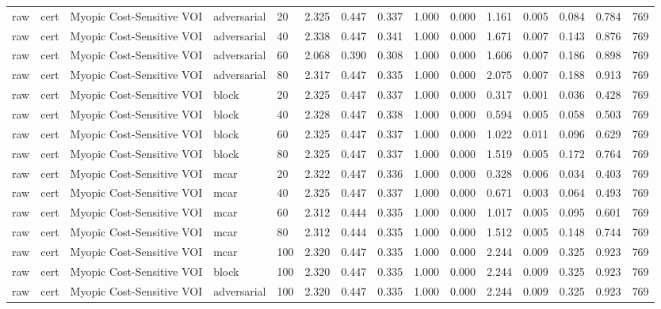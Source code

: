 \begin{table}[!ht]
{\begin{tabular}{lllllllllllllll}
raw & cert & Myopic Cost-Sensitive VOI & adversarial & 20 & 2.325 & 0.447 & 0.337 & 1.000 & 0.000 & 1.161 & 0.005 & 0.084 & 0.784 & 769 \\
raw & cert & Myopic Cost-Sensitive VOI & adversarial & 40 & 2.338 & 0.447 & 0.341 & 1.000 & 0.000 & 1.671 & 0.007 & 0.143 & 0.876 & 769 \\
raw & cert & Myopic Cost-Sensitive VOI & adversarial & 60 & 2.068 & 0.390 & 0.308 & 1.000 & 0.000 & 1.606 & 0.007 & 0.186 & 0.898 & 769 \\
raw & cert & Myopic Cost-Sensitive VOI & adversarial & 80 & 2.317 & 0.447 & 0.335 & 1.000 & 0.000 & 2.075 & 0.007 & 0.188 & 0.913 & 769 \\
raw & cert & Myopic Cost-Sensitive VOI & block & 20 & 2.325 & 0.447 & 0.337 & 1.000 & 0.000 & 0.317 & 0.001 & 0.036 & 0.428 & 769 \\
raw & cert & Myopic Cost-Sensitive VOI & block & 40 & 2.328 & 0.447 & 0.338 & 1.000 & 0.000 & 0.594 & 0.005 & 0.058 & 0.503 & 769 \\
raw & cert & Myopic Cost-Sensitive VOI & block & 60 & 2.325 & 0.447 & 0.337 & 1.000 & 0.000 & 1.022 & 0.011 & 0.096 & 0.629 & 769 \\
raw & cert & Myopic Cost-Sensitive VOI & block & 80 & 2.325 & 0.447 & 0.337 & 1.000 & 0.000 & 1.519 & 0.005 & 0.172 & 0.764 & 769 \\
raw & cert & Myopic Cost-Sensitive VOI & mcar & 20 & 2.322 & 0.447 & 0.336 & 1.000 & 0.000 & 0.328 & 0.006 & 0.034 & 0.403 & 769 \\
raw & cert & Myopic Cost-Sensitive VOI & mcar & 40 & 2.325 & 0.447 & 0.337 & 1.000 & 0.000 & 0.671 & 0.003 & 0.064 & 0.493 & 769 \\
raw & cert & Myopic Cost-Sensitive VOI & mcar & 60 & 2.312 & 0.444 & 0.335 & 1.000 & 0.000 & 1.017 & 0.005 & 0.095 & 0.601 & 769 \\
raw & cert & Myopic Cost-Sensitive VOI & mcar & 80 & 2.312 & 0.444 & 0.335 & 1.000 & 0.000 & 1.512 & 0.005 & 0.148 & 0.744 & 769 \\
raw & cert & Myopic Cost-Sensitive VOI & mcar & 100 & 2.320 & 0.447 & 0.335 & 1.000 & 0.000 & 2.244 & 0.009 & 0.325 & 0.923 & 769 \\
raw & cert & Myopic Cost-Sensitive VOI & block & 100 & 2.320 & 0.447 & 0.335 & 1.000 & 0.000 & 2.244 & 0.009 & 0.325 & 0.923 & 769 \\
raw & cert & Myopic Cost-Sensitive VOI & adversarial & 100 & 2.320 & 0.447 & 0.335 & 1.000 & 0.000 & 2.244 & 0.009 & 0.325 & 0.923 & 769 \\

\end{tabular}}
\end{table}
